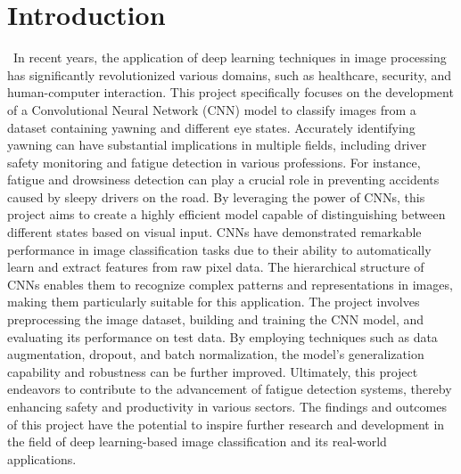\documentclass[conference]{IEEEtran}
\begin{document}
 \section{Introduction} 

\ In recent years, the application of deep learning techniques in image processing has significantly revolutionized various domains, such as healthcare, security, and human-computer interaction. This project specifically focuses on the development of a Convolutional Neural Network (CNN) model to classify images from a dataset containing yawning and different eye states. Accurately identifying yawning can have substantial implications in multiple fields, including driver safety monitoring and fatigue detection in various professions. For instance, fatigue and drowsiness detection can play a crucial role in preventing accidents caused by sleepy drivers on the road. By leveraging the power of CNNs, this project aims to create a highly efficient model capable of distinguishing between different states based on visual input. CNNs have demonstrated remarkable performance in image classification tasks due to their ability to automatically learn and extract features from raw pixel data. The hierarchical structure of CNNs enables them to recognize complex patterns and representations in images, making them particularly suitable for this application. The project involves preprocessing the image dataset, building and training the CNN model, and evaluating its performance on test data. By employing techniques such as data augmentation, dropout, and batch normalization, the model's generalization capability and robustness can be further improved. Ultimately, this project endeavors to contribute to the advancement of fatigue detection systems, thereby enhancing safety and productivity in various sectors. The findings and outcomes of this project have the potential to inspire further research and development in the field of deep learning-based image classification and its real-world applications.
\end{document}
